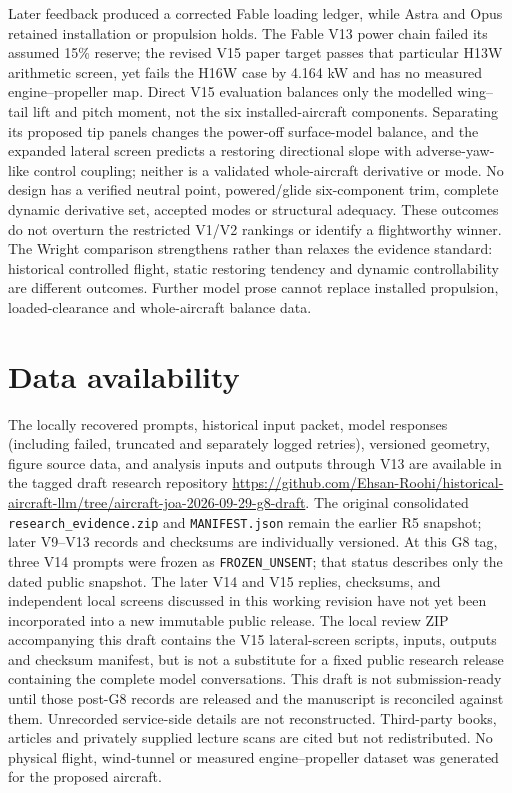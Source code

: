 \documentclass[10pt,letterpaper]{article}
\begin{document}
Later feedback produced a corrected Fable loading ledger, while Astra and Opus retained installation or propulsion holds. The Fable V13 power chain failed its assumed 15\% reserve; the revised V15 paper target passes that particular H13W arithmetic screen, yet fails the H16W case by 4.164 kW and has no measured engine--propeller map. Direct V15 evaluation balances only the modelled wing--tail lift and pitch moment, not the six installed-aircraft components. Separating its proposed tip panels changes the power-off surface-model balance, and the expanded lateral screen predicts a restoring directional slope with adverse-yaw-like control coupling; neither is a validated whole-aircraft derivative or mode. No design has a verified neutral point, powered/glide six-component trim, complete dynamic derivative set, accepted modes or structural adequacy. These outcomes do not overturn the restricted V1/V2 rankings or identify a flightworthy winner. The Wright comparison strengthens rather than relaxes the evidence standard: historical controlled flight, static restoring tendency and dynamic controllability are different outcomes. Further model prose cannot replace installed propulsion, loaded-clearance and whole-aircraft balance data.

\section*{Data availability}
The locally recovered prompts, historical input packet, model responses (including failed, truncated and separately logged retries), versioned geometry, figure source data, and analysis inputs and outputs through V13 are available in the tagged draft research repository \url{https://github.com/Ehsan-Roohi/historical-aircraft-llm/tree/aircraft-joa-2026-09-29-g8-draft}. The original consolidated \texttt{research\_evidence.zip} and \texttt{MANIFEST.json} remain the earlier R5 snapshot; later V9--V13 records and checksums are individually versioned. At this G8 tag, three V14 prompts were frozen as \texttt{FROZEN\_UNSENT}; that status describes only the dated public snapshot. The later V14 and V15 replies, checksums, and independent local screens discussed in this working revision have not yet been incorporated into a new immutable public release. The local review ZIP accompanying this draft contains the V15 lateral-screen scripts, inputs, outputs and checksum manifest, but is not a substitute for a fixed public research release containing the complete model conversations. This draft is not submission-ready until those post-G8 records are released and the manuscript is reconciled against them. Unrecorded service-side details are not reconstructed. Third-party books, articles and privately supplied lecture scans are cited but not redistributed. No physical flight, wind-tunnel or measured engine--propeller dataset was generated for the proposed aircraft.
\end{document}
